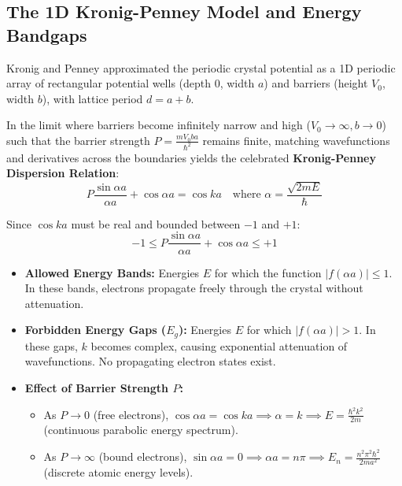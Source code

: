 \subsection{The 1D Kronig-Penney Model and Energy Bandgaps}
Kronig and Penney approximated the periodic crystal potential as a 1D periodic array of rectangular potential wells (depth 0, width $a$) and barriers (height $V_0$, width $b$), with lattice period $d = a+b$.

In the limit where barriers become infinitely narrow and high ($V_0 \to \infty, b \to 0$) such that the barrier strength $P = \frac{m V_0 b a}{\hbar^2}$ remains finite, matching wavefunctions and derivatives across the boundaries yields the celebrated \textbf{Kronig-Penney Dispersion Relation}:
\begin{equation}
    P \frac{\sin \alpha a}{\alpha a} + \cos \alpha a = \cos k a \quad \text{where } \alpha = \frac{\sqrt{2mE}}{\hbar}
\end{equation}

\begin{conceptbox}
Since $\cos ka$ must be real and bounded between $-1$ and $+1$:
\begin{equation}
    -1 \le P \frac{\sin \alpha a}{\alpha a} + \cos \alpha a \le +1
\end{equation}
\begin{itemize}
    \item \textbf{Allowed Energy Bands:} Energies $E$ for which the function $|f(\alpha a)| \le 1$. In these bands, electrons propagate freely through the crystal without attenuation.
    \item \textbf{Forbidden Energy Gaps ($E_g$):} Energies $E$ for which $|f(\alpha a)| > 1$. In these gaps, $k$ becomes complex, causing exponential attenuation of wavefunctions. No propagating electron states exist.
    \item \textbf{Effect of Barrier Strength $P$:}
    \begin{itemize}
        \item As $P \to 0$ (free electrons), $\cos \alpha a = \cos ka \implies \alpha = k \implies E = \frac{\hbar^2 k^2}{2m}$ (continuous parabolic energy spectrum).
        \item As $P \to \infty$ (bound electrons), $\sin \alpha a = 0 \implies \alpha a = n\pi \implies E_n = \frac{n^2\pi^2\hbar^2}{2ma^2}$ (discrete atomic energy levels).
    \end{itemize}
\end{itemize}
\end{conceptbox}

